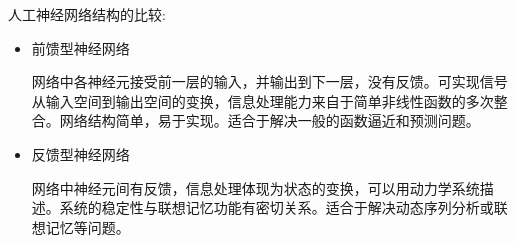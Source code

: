 \begin{note}
    人工神经网络结构的比较:
    \begin{itemize}
        \item 前馈型神经网络
        
        网络中各神经元接受前一层的输入，并输出到下一层，没有反馈。可实现信号从输入空间到输出空间的变换，信息处理能力来自于简单非线性函数的多次整合。网络结构简单，易于实现。适合于解决一般的函数逼近和预测问题。
        \item 反馈型神经网络
        
        网络中神经元间有反馈，信息处理体现为状态的变换，可以用动力学系统描述。系统的稳定性与联想记忆功能有密切关系。适合于解决动态序列分析或联想记忆等问题。
    \end{itemize}
\end{note}

